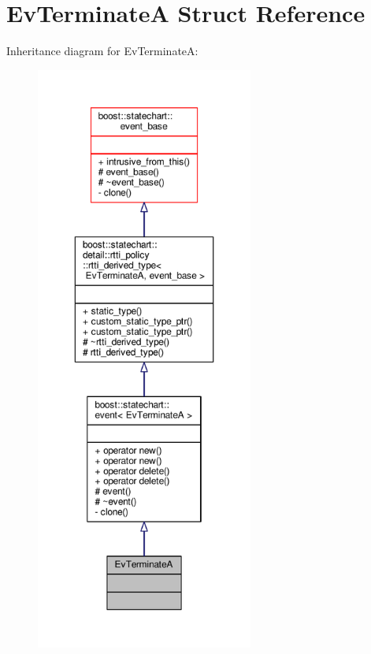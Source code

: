 \hypertarget{struct_ev_terminate_a}{}\section{Ev\+TerminateA Struct Reference}
\label{struct_ev_terminate_a}


Inheritance diagram for Ev\+TerminateA\+:
\nopagebreak
\begin{figure}[H]
\begin{center}
\leavevmode
\includegraphics[height=550pt]{struct_ev_terminate_a__inherit__graph}
\end{center}
\end{figure}


